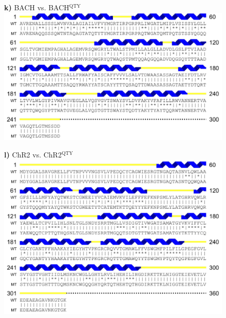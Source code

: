 \documentclass[fleqn,12pt]{supp}
\begin{document}
\newpage
\begin{figure}[H]
    \textbf{k)} BACH vs. BACH$^{\textrm{QTY}}$ \\
    \includegraphics[width=\linewidth]{SuppFigures/bach.jpg}
\end{figure}

\newpage
\begin{figure}[H]
    \textbf{l)} ChR2 vs. ChR2$^{\textrm{QTY}}$ \\
    \includegraphics[width=\linewidth]{SuppFigures/chr2.jpg}
\end{figure}
\end{document}
